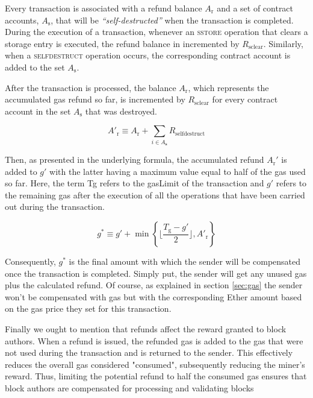 Every transaction is associated with a refund balance $A_{\mathrm{r}}$ and a set of contract accounts, $A_{\mathrm{s}}$, that will be \emph{``self-destructed''} when the transaction is completed. During the execution of a transaction, whenever an \textsc{sstore} operation that clears a storage entry is executed, the refund balance in incremented by $R_{\mathrm{sclear}}$. Similarly, when a \textsc{selfdestruct} operation occurs, the corresponding contract account is added to the set $A_{\mathrm{s}}$.

After the transaction is processed, the balance $A_{\mathrm{r}}$, which represents the accumulated gas refund so far, is incremented by $R_{\mathrm{sclear}}$ for every contract account in the set $A_{\mathrm{s}}$ that was destroyed.

\begin{equation}
	A'_{\mathrm{r}} \equiv A_{\mathrm{r}} + \sum_{i \in A_{\mathbf{s}}} R_{\mathrm{selfdestruct}}
\end{equation}

Then, as presented in the underlying formula, the accumulated refund $A_{\mathrm{r}}'$ is added to $g'$ with the latter having a maximum value equal to half of the gas used so far. Here, the term Tg refers to the gasLimit of the transaction and $g'$ refers to the remaining gas after the execution of all the operations that have been carried out during the transaction.

\begin{equation}
g^* \equiv g' + \min \left\{ \Big\lfloor \dfrac{T_{\mathrm{g}} - g'}{2} \Big\rfloor, A'_{\mathrm{r}} \right\}
\end{equation}

Consequently, $g^*$ is the final amount with which the sender will be compensated once the transaction is completed. Simply put, the sender will get any unused gas plus the calculated refund. Of course, as explained in section \ref{sec:gas} the sender won't be compensated with gas but with the corresponding Ether amount based on the gas price they set for this transaction.

Finally we ought to mention that refunds affect the reward granted to block authors. When a refund is issued, the refunded gas is added to the gas that were not used during the transaction and is returned to the sender. This effectively reduces the overall gas considered "consumed", subsequently reducing the miner's reward. Thus, limiting the potential refund to half the consumed gas ensures that block authors are compensated for processing and validating blocks 

